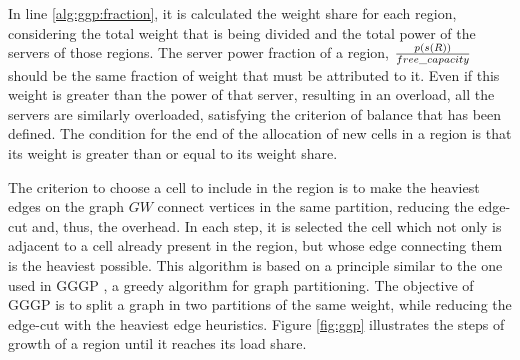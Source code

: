 In line \ref{alg:ggp:fraction}, it is calculated the weight share for each region, considering the total weight that is being divided and the total power of the servers of those regions. The server power fraction of a region, $\frac{p(s(R))}{free\_capacity}$ should be the same fraction of weight that must be attributed to it. Even if this weight is greater than the power of that server, resulting in an overload, all the servers are similarly overloaded, satisfying the criterion of balance that has been defined. The condition for the end of the allocation of new cells in a region is that its weight is greater than or equal to its weight share.



The criterion to choose a cell to include in the region is to make the heaviest edges on the graph $GW$ connect vertices in the same partition, reducing the edge-cut and, thus, the overhead. In each step, it is selected the cell which not only is adjacent to a cell already present in the region, but whose edge connecting them is the heaviest possible. This algorithm is based on a principle similar to the one used in GGGP \cite{karypis1999fah}, a greedy algorithm for graph partitioning. The objective of GGGP is to split a graph in two partitions of the same weight, while reducing the edge-cut with the heaviest edge heuristics. Figure \ref{fig:ggp} illustrates the steps of growth of a region until it reaches its load share.


